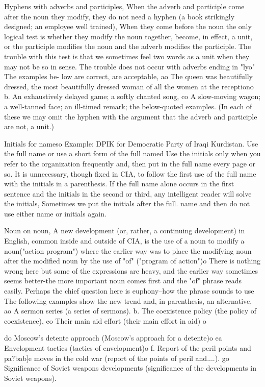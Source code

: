 \documentclass[
    oneside,
    11pt,
    draft
]{memoir}
\begin{document}
Hyphens with adverbs and participles, When the adverb and participle come after the noun they modify, they do not need a hyphen (a book strikingly designed; an employee well trained), When they come before the noun the only logical test is whether they modify the noun together, become, in effect, a unit, or the participle modifies the noun and the adverb modifies the participle. The trouble with this test is that we sometimes feel two words as a unit when they may not be so in sense. The trouble does not occur with adverbs ending in "lyo" The examples be- low are correct, are acceptable, ao The queen was beautifully dressed, the most beautifully dressed woman of all the women at the receptiono b. An exhaustively delayed game; a softly chanted song, co A slow-moving wagon; a well-tanned face; an ill-timed remark; the below-quoted examples. (In each of these we may omit the hyphen with the argument that the adverb and participle are not, a unit.) 

Initials for nameso Example: DPIK for Democratic Party of Iraqi Kurdistan. Use the full name or use a short form of the full named Use the initials only when you refer to the organization frequently and, then put in the full name every page or so. It is unnecessary, though fixed in CIA, to follow the first use of the full name with the initials in a parenthesis. If the full name alone occurs in the first sentence and the initials in the second or third, any intelligent reader will solve the initials, Sometimes we put the initials after the full. name and then do not use either name or initials again. 

Noun on noun, A new development (or, rather, a continuing development) in English, common inside and outside of CIA, is the use of a noun to modify a noun("action program") where the earlier way was to place the modifying noun after the modified noun by the use of "of" ("program of action")o There is nothing wrong here but some of the expressions are heavy, and the earlier way sometimes seems better-the more important noun comes first and the "of" phrase reads easily. Perhaps the chief question here is euphony--how the phrase sounds to use The following examples show the new trend and, in parenthesis, an alternative, ao A sermon series (a series of sermons). b. The coexistence policy (the policy of coexistence), co Their main aid effort (their main effort in aid) o

do Moscow's detente approach (Moscow's approach for a detente)o ea Envelopment tactics (tactics of envelopment)o f. Report of the peril points and pa?bab]e moves in the cold war (report of the points of peril and....). go Significance of Soviet weapons developments (significance of the developments in Soviet weapons). 
\end{document}
